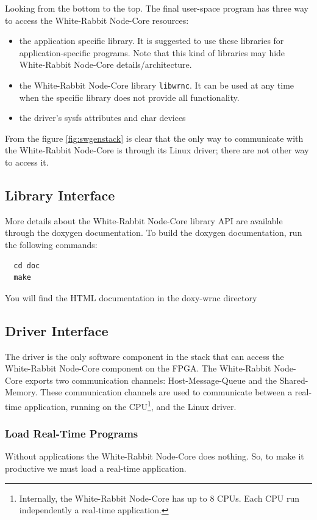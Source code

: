 \documentclass[a4paper,10pt]{article}
\begin{document}
Looking from the bottom to the top. The final user-space program has
three way to access the White-Rabbit Node-Core resources:

\begin{itemize}
  \item the application specific library. It is suggested to use these
    libraries for application-specific programs. Note that this kind of
    libraries may hide White-Rabbit Node-Core details/architecture.
  \item the White-Rabbit Node-Core library \texttt{libwrnc}. It can be
    used at any time when the specific library does not provide all
    functionality.
  \item the driver's sysfs attributes and char devices
\end{itemize}

From the figure \ref{fig:swgenstack} is clear that the only way to
communicate with the White-Rabbit Node-Core is through its Linux
driver; there are not other way to access it.


\subsection{Library Interface}%
More details about the White-Rabbit Node-Core library API are
available through the doxygen documentation. To build the doxygen
documentation, run the following commands:

\begin{verbatim}
  cd doc
  make
\end{verbatim}

You will find the HTML documentation in the doxy-wrnc directory


\subsection{Driver Interface}%
The driver is the only software component in the stack that can access
the White-Rabbit Node-Core component on the FPGA. The White-Rabbit
Node-Core exports two communication channels: Host-Message-Queue and
the Shared-Memory. These communication channels are used to communicate
between a real-time application, running on the
CPU\footnote{Internally, the White-Rabbit Node-Core has up to 8 CPUs.
Each CPU run independently a real-time application.}, and the Linux
driver.


\subsubsection{Load Real-Time Programs}%
Without applications the White-Rabbit Node-Core does nothing. So, to
make it productive we must load a real-time application.
\end{document}
